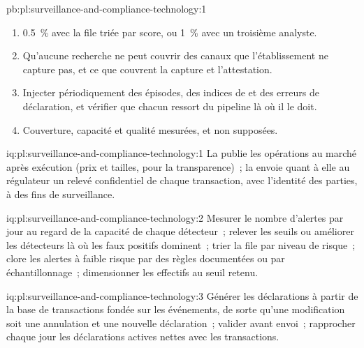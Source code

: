 \begin{solution}{pb:pl:surveillance-and-compliance-technology:1}
\begin{enumerate}
) et 6 doublons~; le générateur fondé sur les événements, aucun.
\item 0.5~\% avec la file triée par score, ou 1~\% avec un troisième analyste.
\item Qu'aucune recherche ne peut couvrir des canaux que l'établissement ne capture pas, et ce que couvrent la capture et l'attestation.
\item Injecter périodiquement des épisodes, des indices de  et des erreurs de déclaration, et vérifier que chacun ressort du pipeline là où il le doit.
\item Couverture, capacité et qualité mesurées, et non supposées.
\end{enumerate}
\end{solution}

\begin{solution}{iq:pl:surveillance-and-compliance-technology:1}
La  publie les opérations au marché après exécution (prix et tailles, pour la transparence)~; la  envoie quant à elle au
régulateur un relevé confidentiel de chaque transaction, avec l'identité des parties, à des fins de surveillance.
\end{solution}

\begin{solution}{iq:pl:surveillance-and-compliance-technology:2}
Mesurer le nombre d'alertes par jour au regard de la capacité de chaque détecteur~; relever les seuils ou améliorer les détecteurs là où les faux positifs dominent~; trier la file par
niveau de risque~; clore les alertes à faible risque par des règles documentées ou par échantillonnage~; dimensionner les effectifs au seuil retenu.
\end{solution}

\begin{solution}{iq:pl:surveillance-and-compliance-technology:3}
Générer les déclarations à partir de la base de transactions fondée sur les événements, de sorte qu'une modification soit une annulation et une nouvelle déclaration~; valider avant envoi~; rapprocher
chaque jour les déclarations actives nettes avec les transactions.
\end{solution}

